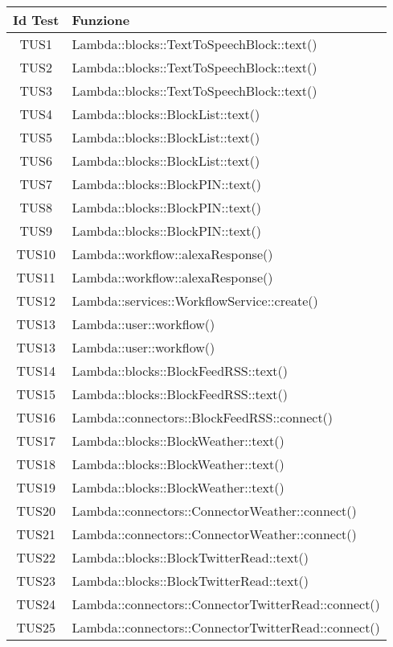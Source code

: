 \normalsize
\begin{longtable}{|c|m{24em}|}
\hline 
\textbf{Id Test} & \textbf{Funzione}\\
\hline
\endhead
TUS1 & Lambda::blocks::TextToSpeechBlock::text()\\ \hline
TUS2 & Lambda::blocks::TextToSpeechBlock::text()\\ \hline
TUS3 & Lambda::blocks::TextToSpeechBlock::text()\\ \hline
TUS4 & Lambda::blocks::BlockList::text()\\ \hline
TUS5 & Lambda::blocks::BlockList::text()\\ \hline
TUS6 & Lambda::blocks::BlockList::text()\\ \hline
TUS7 & Lambda::blocks::BlockPIN::text()\\ \hline
TUS8 & Lambda::blocks::BlockPIN::text()\\ \hline
TUS9 & Lambda::blocks::BlockPIN::text()\\ \hline
TUS10 & Lambda::workflow::alexaResponse()\\ \hline
TUS11 & Lambda::workflow::alexaResponse()\\ \hline
TUS12 & Lambda::services::WorkflowService::create()\\ \hline
TUS13 & Lambda::user::workflow()\\ \hline
TUS13 & Lambda::user::workflow()\\ \hline
TUS14 & Lambda::blocks::BlockFeedRSS::text()\\ \hline
TUS15 & Lambda::blocks::BlockFeedRSS::text()\\ \hline
TUS16 & Lambda::connectors::BlockFeedRSS::connect()\\ \hline
TUS17 & Lambda::blocks::BlockWeather::text()\\ \hline
TUS18 & Lambda::blocks::BlockWeather::text()\\ \hline
TUS19 & Lambda::blocks::BlockWeather::text()\\ \hline
TUS20 & Lambda::connectors::ConnectorWeather::connect()\\ \hline
TUS21 & Lambda::connectors::ConnectorWeather::connect()\\ \hline
TUS22 & Lambda::blocks::BlockTwitterRead::text()\\ \hline
TUS23 & Lambda::blocks::BlockTwitterRead::text()\\ \hline
TUS24 & Lambda::connectors::ConnectorTwitterRead::connect()\\ \hline
TUS25 & Lambda::connectors::ConnectorTwitterRead::connect()\\ \hline

\end{longtable}

